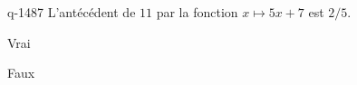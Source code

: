 \begin{truefalse}{q-1487}
L'antécédent de $11$ par la fonction $x\mapsto 5x+7$ est $2/5$.
\item Vrai
\item* Faux
\end{truefalse}

